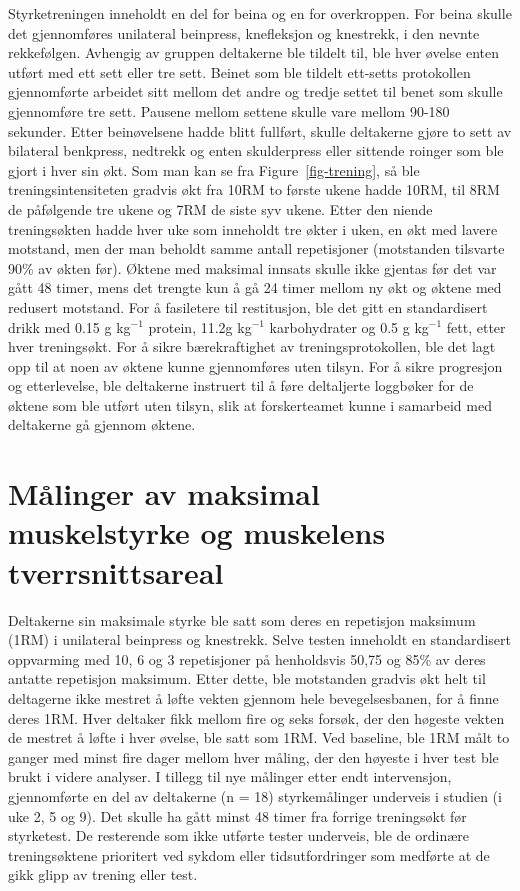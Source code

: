 \documentclass[
  letterpaper,
  DIV=11,
  numbers=noendperiod]{scrreprt}
\begin{document}
Styrketreningen inneholdt en del for beina og en for overkroppen. For
beina skulle det gjennomføres unilateral beinpress, knefleksjon og
knestrekk, i den nevnte rekkefølgen. Avhengig av gruppen deltakerne ble
tildelt til, ble hver øvelse enten utført med ett sett eller tre sett.
Beinet som ble tildelt ett-setts protokollen gjennomførte arbeidet sitt
mellom det andre og tredje settet til benet som skulle gjennomføre tre
sett. Pausene mellom settene skulle vare mellom 90-180 sekunder. Etter
beinøvelsene hadde blitt fullført, skulle deltakerne gjøre to sett av
bilateral benkpress, nedtrekk og enten skulderpress eller sittende
roinger som ble gjort i hver sin økt. Som man kan se fra
Figure~\ref{fig-trening}, så ble treningsintensiteten gradvis økt fra
10RM to første ukene hadde 10RM, til 8RM de påfølgende tre ukene og 7RM
de siste syv ukene. Etter den niende treningsøkten hadde hver uke som
inneholdt tre økter i uken, en økt med lavere motstand, men der man
beholdt samme antall repetisjoner (motstanden tilsvarte 90\% av økten
før). Øktene med maksimal innsats skulle ikke gjentas før det var gått
48 timer, mens det trengte kun å gå 24 timer mellom ny økt og øktene med
redusert motstand. For å fasiletere til restitusjon, ble det gitt en
standardisert drikk med 0.15 g kg\(^{-1}\) protein, 11.2g kg\(^{-1}\)
karbohydrater og 0.5 g kg\(^{-1}\) fett, etter hver treningsøkt. For å
sikre bærekraftighet av treningsprotokollen, ble det lagt opp til at
noen av øktene kunne gjennomføres uten tilsyn. For å sikre progresjon og
etterlevelse, ble deltakerne instruert til å føre deltaljerte loggbøker
for de øktene som ble utført uten tilsyn, slik at forskerteamet kunne i
samarbeid med deltakerne gå gjennom øktene.

\section{Målinger av maksimal muskelstyrke og muskelens
tverrsnittsareal}\label{muxe5linger-av-maksimal-muskelstyrke-og-muskelens-tverrsnittsareal}

Deltakerne sin maksimale styrke ble satt som deres en repetisjon
maksimum (1RM) i unilateral beinpress og knestrekk. Selve testen
inneholdt en standardisert oppvarming med 10, 6 og 3 repetisjoner på
henholdsvis 50,75 og 85\% av deres antatte repetisjon maksimum. Etter
dette, ble motstanden gradvis økt helt til deltagerne ikke mestret å
løfte vekten gjennom hele bevegelsesbanen, for å finne deres 1RM. Hver
deltaker fikk mellom fire og seks forsøk, der den høgeste vekten de
mestret å løfte i hver øvelse, ble satt som 1RM. Ved baseline, ble 1RM
målt to ganger med minst fire dager mellom hver måling, der den høyeste
i hver test ble brukt i videre analyser. I tillegg til nye målinger
etter endt intervensjon, gjennomførte en del av deltakerne (n = 18)
styrkemålinger underveis i studien (i uke 2, 5 og 9). Det skulle ha gått
minst 48 timer fra forrige treningsøkt før styrketest. De resterende som
ikke utførte tester underveis, ble de ordinære treningsøktene prioritert
ved sykdom eller tidsutfordringer som medførte at de gikk glipp av
trening eller test.
\end{document}
